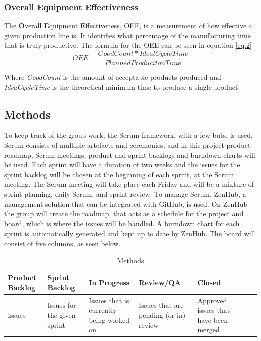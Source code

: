 \subsubsection{Overall Equipment Effectiveness}
The \textbf{O}verall \textbf{E}quipment \textbf{E}ffectiveness, OEE, is a
measurement of how effective a given production line is. It identifies what
percentage of the manufacturing time that is truly productive. The formula for
the OEE can be seen in equation \ref{eq:2}
\begin{equation} \label{eq:2}
    OEE = \frac{Good Count * Ideal Cycle Time}{Planned Produciton Time}
\end{equation}

Where \textit{GoodCount} is the amount of acceptable products produced and
\textit{IdeaCycleTime} is the theoretical minimum time to produce a single
product.


\subsection{Methods}
To keep track of the group work, the Scrum framework, with a few buts, is used.
Scrum consists of multiple artefacts and ceremonies, and in this project product
roadmap, Scrum meetings, product and sprint backlogs and burndown charts will
be used. Each sprint will have a duration of two weeks and the issues for the
sprint backlog will be chosen at the beginning of each sprint, at the Scrum
meeting. The Scrum meeting will take place each Friday and will be a mixture of
sprint planning, daily Scrum, and sprint review. To manage Scrum, ZenHub, a
management solution that can be integrated with GitHub, is used. On ZenHub the
group will create the roadmap, that acts as a schedule for the project and
board, which is where the issues will be handled. A burndown chart for each
sprint is automatically generated and kept up to date by ZenHub. The board will
consist of five columns, as seen below.

\begin{table}[H]
    \begin{tabularx}{\textwidth}{|>{\RaggedRight}X|>{\RaggedRight}X|>{\RaggedRight}X|>{\RaggedRight}X|>{\RaggedRight}X|>{\RaggedRight}X|>{\RaggedRight}X|}
        \hline                             
        \textbf{Product Backlog} & \textbf{Sprint Backlog} & \textbf{In Progress} & \textbf{Review/QA} & \textbf{Closed} \\
        \hline
        Issues & Issues for the given sprint & Issues that is currently being worked on & Issues that are pending (or in) review & Approved issues that have been merged    \\
        \hline
    \end{tabularx}
    \caption{Methods} 
    \label{table:Methods}
\end{table} 